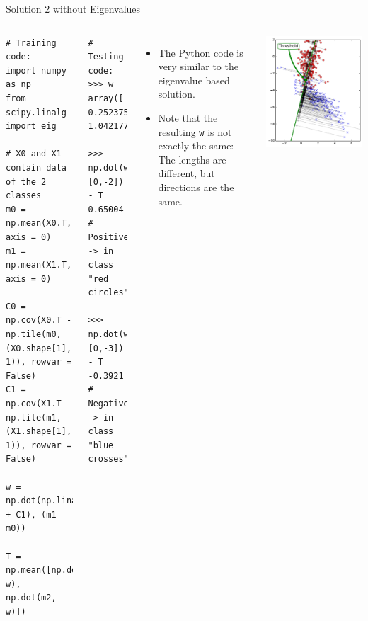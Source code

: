 \documentclass[10pt, aspectratio=169]{beamer} %
\begin{document}
\begin{frame}[fragile,allowframebreaks=0.8]
 {Solution 2 without Eigenvalues}
\begin{columns}[onlytextwidth]
\begin{lstlisting}
# Training code:
import numpy as np
from scipy.linalg import eig

# X0 and X1 contain data of the 2 classes
m0 = np.mean(X0.T, axis = 0)
m1 = np.mean(X1.T, axis = 0)

C0 = np.cov(X0.T - np.tile(m0, (X0.shape[1], 1)), rowvar = False)
C1 = np.cov(X1.T - np.tile(m1, (X1.shape[1], 1)), rowvar = False)

w = np.dot(np.linalg.inv(C0 + C1), (m1 - m0))

T = np.mean([np.dot(m1, w), np.dot(m2, w)])
\end{lstlisting}
\begin{lstlisting}
# Testing code:
>>> w
array([ 0.25237576,  1.04217702])

>>> np.dot(w, [0,-2]) - T
0.65004
# Positive -> in class "red circles"

>>> np.dot(w, [0,-3]) - T
-0.3921
# Negative -> in class "blue crosses"
\end{lstlisting}
\begin{itemize}
\item The Python code is very similar to the eigenvalue based solution.
\item Note that the resulting \verb+w+ is not exactly the same: The lengths
are different, but directions are the same.
\end{itemize}
\centerline{\includegraphics[width=0.6\columnwidth]{LDA_proj1_threshold.pdf}}
\end{columns}
\end{frame}
\end{document}
